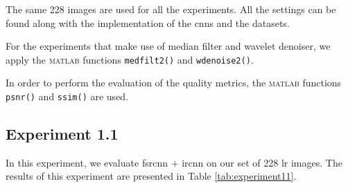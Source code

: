 The same 228 images are used for all the experiments. All the settings can be found along with the implementation of the \glspl{cnn} and the datasets. 

For the experiments that make use of median filter and wavelet denoiser, we apply the \textsc{matlab} functions \texttt{medfilt2()} and \texttt{wdenoise2()}.

In order to perform the evaluation of the quality metrics, the \textsc{matlab} functions \texttt{psnr()} and \texttt{ssim()} are used.

\subsection{Experiment 1.1}
In this experiment, we evaluate \gls{fsrcnn} $+$ \gls{ircnn} on our set of 228 \gls{lr} images. The results of this experiment are presented in Table \ref{tab:experiment11}.

